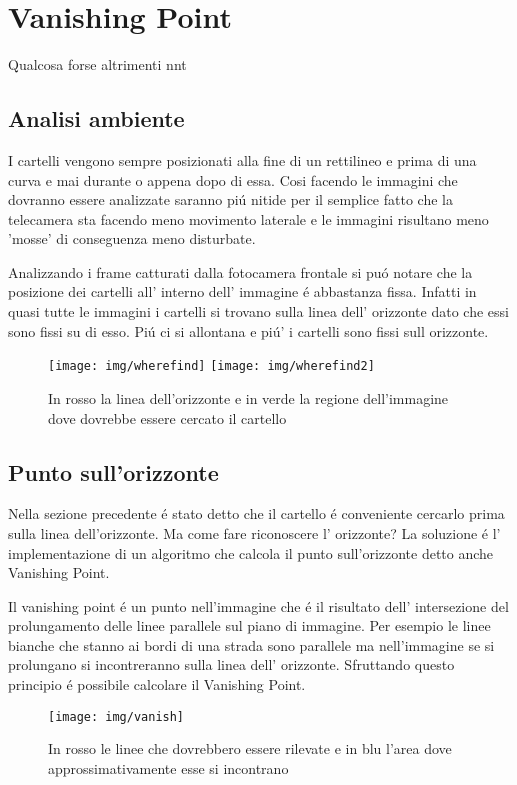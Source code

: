 \section{Vanishing Point}

	Qualcosa forse altrimenti nnt

	\subsection{Analisi ambiente}

		I cartelli vengono sempre posizionati alla fine di un rettilineo e prima di una curva e mai durante o appena dopo di essa. Cosi facendo le immagini che dovranno essere analizzate saranno pi\'u nitide per il semplice fatto che la telecamera sta facendo meno movimento laterale e le immagini risultano meno 'mosse' di conseguenza meno disturbate.

		Analizzando i frame catturati dalla fotocamera frontale si pu\'o notare che la posizione dei cartelli all' interno dell' immagine \'e abbastanza fissa. Infatti in quasi tutte le immagini i cartelli si trovano sulla linea dell' orizzonte dato che essi sono fissi su di esso. Pi\'u ci si allontana e pi\'u' i cartelli sono fissi sull orizzonte.
		\begin{figure}[!ht]
			\centering
			\texttt{[image: img/wherefind]}
			\texttt{[image: img/wherefind2]}
			\caption{In rosso la linea dell'orizzonte e in verde la regione dell'immagine dove dovrebbe essere cercato il cartello}
		\end{figure}


	\subsection{Punto sull'orizzonte}

		Nella sezione precedente \'e stato detto che il cartello \'e conveniente cercarlo prima sulla linea dell'orizzonte. Ma come fare riconoscere l' orizzonte? La soluzione \'e l' implementazione di un algoritmo che calcola il punto sull'orizzonte detto anche Vanishing Point.
		
		Il vanishing point \'e un punto nell'immagine che \'e il risultato  dell' intersezione del prolungamento delle linee parallele sul piano di immagine. Per esempio le linee bianche che stanno ai bordi di una strada sono parallele ma nell'immagine se si prolungano si incontreranno sulla linea dell' orizzonte. Sfruttando questo principio \'e possibile calcolare il Vanishing Point.
		\begin{figure}[!ht]
			\centering
			\texttt{[image: img/vanish]}
			\caption{In rosso le linee che dovrebbero essere rilevate e in blu l'area dove approssimativamente esse si incontrano}
		\end{figure}

